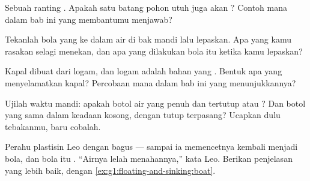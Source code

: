 \begin{exercise}[$\star$]\label{exo:g1:floating-and-sinking:5}
Sebuah ranting . Apakah satu batang pohon utuh juga akan
? Contoh mana dalam bab ini yang membantumu menjawab?
\end{exercise}

\begin{exercise}[$\star$]\label{exo:g1:floating-and-sinking:6}
Tekanlah bola yang  ke dalam air di bak mandi lalu lepaskan.
Apa yang kamu rasakan selagi menekan, dan apa yang dilakukan bola itu
ketika kamu lepaskan?
\end{exercise}

\begin{exercise}[$\star$]\label{exo:g1:floating-and-sinking:7}
Kapal dibuat dari logam, dan logam adalah bahan yang . Bentuk
apa yang menyelamatkan kapal? Percobaan mana dalam bab ini yang
menunjukkannya?
\end{exercise}

\begin{exercise}[$\star$]\label{exo:g1:floating-and-sinking:8}
Ujilah waktu mandi: apakah botol air yang penuh dan tertutup 
atau ? Dan botol yang sama dalam keadaan kosong, dengan tutup
terpasang? Ucapkan dulu tebakanmu, baru cobalah.
\end{exercise}

\begin{exercise}[$\star\star$]\label{exo:g1:floating-and-sinking:9}
Perahu plastisin Leo  dengan bagus --- sampai ia memencetnya
kembali menjadi bola, dan bola itu . ``Airnya lelah
menahannya,'' kata Leo. Berikan penjelasan yang lebih baik, dengan
\cref{ex:g1:floating-and-sinking:boat}.
\end{exercise}

